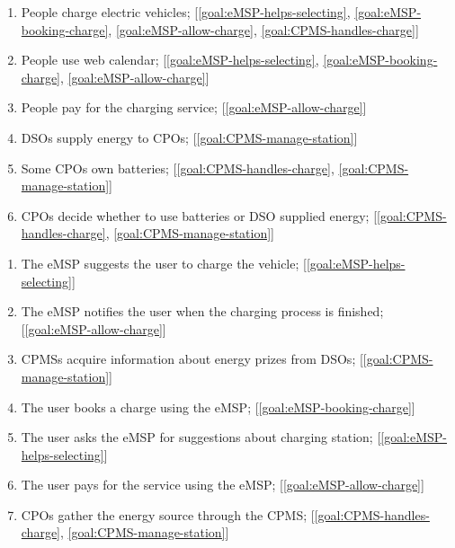 \begin{enumerate}[label=\textbf{W\arabic*}]
    \item People charge electric vehicles; \label{world:people-charge-vehicles} [\ref{goal:eMSP-helps-selecting}, \ref{goal:eMSP-booking-charge}, \ref{goal:eMSP-allow-charge}, \ref{goal:CPMS-handles-charge}]
    \item People use web calendar; \label{world:people-use-calendars} [\ref{goal:eMSP-helps-selecting}, \ref{goal:eMSP-booking-charge}, \ref{goal:eMSP-allow-charge}]
    \item People pay for the charging service; \label{world:people-pay-service} [\ref{goal:eMSP-allow-charge}]
    \item \acp{DSO} supply energy to \acp{CPO}; \label{world:DSO-supply-energy} [\ref{goal:CPMS-manage-station}]
    \item Some \acp{CPO} own batteries; \label{world:CPO-own-batteries} [\ref{goal:CPMS-handles-charge}, \ref{goal:CPMS-manage-station}]
    \item \acp{CPO} decide whether to use batteries or \ac{DSO} supplied energy; \label{world:CPO-decide-energy} [\ref{goal:CPMS-handles-charge}, \ref{goal:CPMS-manage-station}]
\end{enumerate}
\begin{enumerate}[label=\textbf{S\arabic*}]
    \item The \ac{eMSP} suggests the user to charge the vehicle; \label{shared:eMSP-suggests-charge} [\ref{goal:eMSP-helps-selecting}]
    \item The \ac{eMSP} notifies the user when the charging process is finished; \label{shared:eMSP-notifies-charging-finished} [\ref{goal:eMSP-allow-charge}]
    \item \acp{CPMS} acquire information about energy prizes from \acp{DSO}; \label{shared:CPMS-info-from-DSO} [\ref{goal:CPMS-manage-station}]
    \item The user books a charge using the \ac{eMSP}; \label{shared:user-books-charge} [\ref{goal:eMSP-booking-charge}]
    \item The user asks the \ac{eMSP} for suggestions about charging station; \label{shared:user-asks-suggestions} [\ref{goal:eMSP-helps-selecting}]
    \item The user pays for the service using the \ac{eMSP}; \label{shared:user-pays-service} [\ref{goal:eMSP-allow-charge}]
    \item \acp{CPO} gather the energy source through the \ac{CPMS}; \label{shared:CPO-energy-through-CPMS} [\ref{goal:CPMS-handles-charge}, \ref{goal:CPMS-manage-station}]
\end{enumerate}

